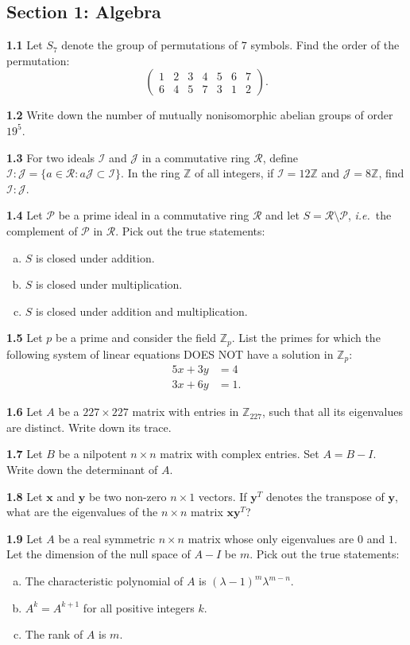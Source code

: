 \documentclass[11pt,a4paper]{article}
\newcommand{\Z}{\mathbb{Z}}
\newcommand{\examsec}[1]{%
  \subsection*{#1}
  \vspace{-2pt}
}
\newcommand{\qitem}[1]{\par\medskip\noindent\textbf{#1}\hspace{0.5em}}
\begin{document}
\examsec{Section 1: Algebra}

\qitem{1.1} Let $S_7$ denote the group of permutations of $7$ symbols. Find the order of the permutation:
\[
  \begin{pmatrix} 1 & 2 & 3 & 4 & 5 & 6 & 7 \\ 6 & 4 & 5 & 7 & 3 & 1 & 2 \end{pmatrix}.
\]

\qitem{1.2} Write down the number of mutually nonisomorphic abelian groups of order $19^5$.

\qitem{1.3} For two ideals $\mathcal{I}$ and $\mathcal{J}$ in a commutative ring $\mathcal{R}$, define $\mathcal{I} : \mathcal{J} = \{a \in \mathcal{R} : a\mathcal{J} \subset \mathcal{I}\}$. In the ring $\Z$ of all integers, if $\mathcal{I} = 12\Z$ and $\mathcal{J} = 8\Z$, find $\mathcal{I} : \mathcal{J}$.

\qitem{1.4} Let $\mathcal{P}$ be a prime ideal in a commutative ring $\mathcal{R}$ and let $S = \mathcal{R} \setminus \mathcal{P}$, \emph{i.e.}\ the complement of $\mathcal{P}$ in $\mathcal{R}$. Pick out the true statements:
\begin{enumerate}[(a)]
  \item $S$ is closed under addition.
  \item $S$ is closed under multiplication.
  \item $S$ is closed under addition and multiplication.
\end{enumerate}

\qitem{1.5} Let $p$ be a prime and consider the field $\Z_p$. List the primes for which the following system of linear equations DOES NOT have a solution in $\Z_p$:
\begin{align*}
  5x + 3y &= 4 \\
  3x + 6y &= 1.
\end{align*}

\qitem{1.6} Let $A$ be a $227 \times 227$ matrix with entries in $\Z_{227}$, such that all its eigenvalues are distinct. Write down its trace.

\qitem{1.7} Let $B$ be a nilpotent $n \times n$ matrix with complex entries. Set $A = B - I$. Write down the determinant of $A$.

\qitem{1.8} Let $\mathbf{x}$ and $\mathbf{y}$ be two non-zero $n \times 1$ vectors. If $\mathbf{y}^T$ denotes the transpose of $\mathbf{y}$, what are the eigenvalues of the $n \times n$ matrix $\mathbf{x}\mathbf{y}^T$?

\qitem{1.9} Let $A$ be a real symmetric $n \times n$ matrix whose only eigenvalues are $0$ and $1$. Let the dimension of the null space of $A - I$ be $m$. Pick out the true statements:
\begin{enumerate}[(a)]
  \item The characteristic polynomial of $A$ is $(\lambda - 1)^m \lambda^{m-n}$.
  \item $A^k = A^{k+1}$ for all positive integers $k$.
  \item The rank of $A$ is $m$.
\end{enumerate}
\end{document}
